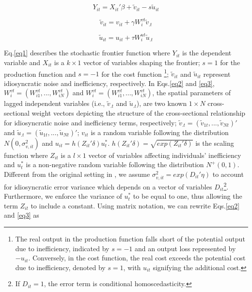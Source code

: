 \begin{equation}\label{eq1}
 Y_{it} = X_{it}'\beta + \tilde{v}_{it}-s\tilde{u}_{it}
\end{equation}

\begin{equation}\label{eq2}
	\tilde{v}_{it} =v_{it}+ \gamma W_{i}^{vt}\tilde{v}_{.t} 
\end{equation}

\begin{equation}\label{eq3}
	\tilde{u}_{it} =u_{it}+ \tau W_{i}^{ut}\tilde{u}_{.t} 
\end{equation}

  Eq.\eqref{eq1}  describes the stochastic frontier function where $Y_{it}$ is the dependent variable and $X_{it}$ is a $k \times 1$ vector of variables shaping the frontier; $s=1$ for the production function and  $s=-1$ for the cost function \footnote{The real output in the production function falls short of the potential output due to inefficiency, indicated by $s=-1$ and an output loss represented by $-u_{it}$. Conversely, in the cost function, the real cost exceeds the potential cost due to inefficiency, denoted by $s=1$, with $u_{it}$ signifying the additional cost.}; $\tilde{v}_{it}$ and $\tilde{u}_{it}$ represent  idiosyncratic noise and inefficiency, respectively. In  Eqs.\eqref{eq2} and \eqref{eq3}, $W_{i}^{vt}=(W_{i1}^{vt},...,W_{iN}^{vt})$ and $W_{i}^{vt}=(W_{i1}^{vt},...,W_{iN}^{vt})$, the spatial parameters of lagged independent variables (i.e., $\tilde{v}_{.t}$ and $\tilde{u}_{.t}$), are two known $1 \times N$ cross-sectional weight vectors  depicting the structure of the  cross-sectional relationship for idiosyncratic noise and inefficiency terms, respectively; $\tilde{v}_{.t}=(\tilde{v}_{1t},...,\tilde{v}_{Nt})' $ and $\tilde{u}_{.t}=(\tilde{u}_{1t},...,\tilde{u}_{Nt})'$; $v_{it}$  is a random variable following the distribution $N(0,\sigma_{v,it}^2)$ and $u_{it}=h(Z_{it}'\delta)u_t^*$. $h(Z_{it}'\delta)=\sqrt{exp(Z_{it}'\delta)}$ is the scaling function where $Z_{it}$ is a $l \times 1$ vector of variables affecting individuals' inefficiency  and $u_t^*$ is a non-negative random variable following the distribution $N^+(0,1)$.  Different from the original setting in \cite{orea2019new}, we assume $\sigma_{v,it}^2=exp(D_{it}'\eta)$ to account for idiosyncratic error variance which depends on a vector of variables $D_{it}$\footnote{If $D_{it}=1$, the error term is conditional homoscedasticity.}. Furthermore, we enforce the variance of $u_t^*$ to be equal to one, thus allowing the term $Z_{it}$ to include a constant. Using matrix notation, we can rewrite Eqs.\eqref{eq2} and \eqref{eq3} as
 
